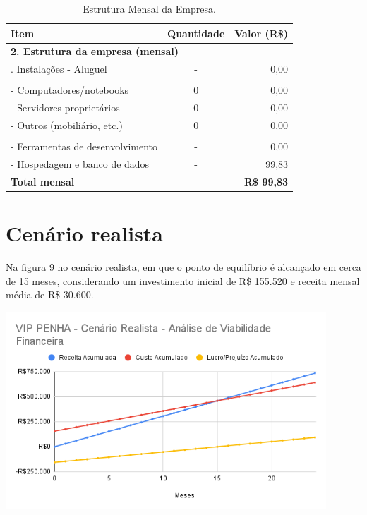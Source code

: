 \documentclass[
	12pt,				%
	openany,			%
	twoside,			%
	a4paper,			%
	english,			%
	brazil				%
	]{abntex2}
\begin{document}
\begin{table}[hbtp]
\centering
\caption{Estrutura Mensal da Empresa.}
\label{tab:estrutura_mensal}
\begin{tabular}{lcr}
\toprule
\textbf{Item} & \textbf{Quantidade} & \textbf{Valor (R\$)} \\
\midrule
\multicolumn{3}{l}{\textbf{2. Estrutura da empresa (mensal)}} \\
\addlinespace %
\quad 2.1. Instalações - Aluguel & - & 0,00 \\
\addlinespace
\multicolumn{3}{l}{\quad 2.2. Equipamentos (TI e Outros)} \\
\qquad - Computadores/notebooks & 0 & 0,00 \\
\qquad - Servidores proprietários & 0 & 0,00 \\
\qquad - Outros (mobiliário, etc.) & 0 & 0,00 \\
\addlinespace
\multicolumn{3}{l}{\quad 2.3. Serviços de TI} \\
\qquad - Ferramentas de desenvolvimento & - & 0,00 \\
\qquad - Hospedagem e banco de dados & - &99,83 \\
\midrule
\textbf{Total mensal} & & \textbf{R\$ 99,83} \\
\bottomrule
\end{tabular}
\end{table}


\section{Cenário realista}
Na figura 9 no cenário realista, em que o ponto de equilíbrio é alcançado em cerca de 15 meses, considerando um investimento inicial de R\$ 155.520 e receita mensal média de R\$ 30.600.
\begin{center}
  \includegraphics[width=0.9\textwidth]{Figuras/CenarioRealista.png}
\end{center}
\end{document}
